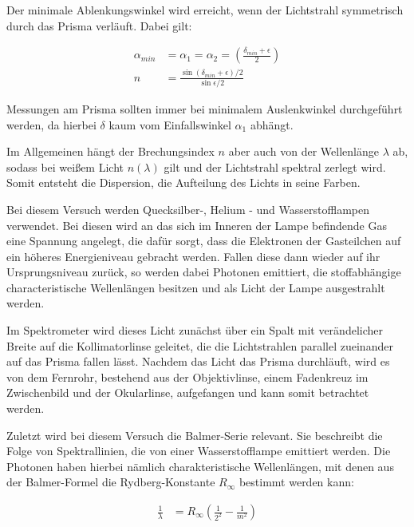 \documentclass{article}
\begin{document}
\newpage

Der minimale Ablenkungswinkel wird erreicht, wenn der Lichtstrahl symmetrisch durch das Prisma verläuft. Dabei gilt:

\begin{equation}
    \begin{split}
        \alpha_{min} &= \alpha_1 = \alpha_2 = \left( \frac{\delta_{min} + \epsilon}{2} \right) \\
        n &= \frac{\sin{(\delta_{min} + \epsilon)/2}}{\sin{\epsilon / 2}}
    \end{split}
\end{equation}

Messungen am Prisma sollten immer bei minimalem Auslenkwinkel durchgeführt werden, da hierbei $\delta$ kaum vom Einfallswinkel $\alpha_1$ abhängt.

Im Allgemeinen hängt der Brechungsindex $n$ aber auch von der Wellenlänge $\lambda$ ab, sodass bei weißem Licht $n(\lambda)$ gilt und der Lichtstrahl spektral zerlegt wird. Somit entsteht die Dispersion, die Aufteilung des Lichts in seine Farben.

Bei diesem Versuch werden Quecksilber-, Helium - und Wasserstofflampen verwendet. Bei diesen wird an das sich im Inneren der Lampe befindende Gas eine Spannung angelegt, die dafür sorgt, dass die Elektronen der Gasteilchen auf ein höheres Energieniveau gebracht werden. Fallen diese dann wieder auf ihr Ursprungsniveau zurück, so werden dabei Photonen emittiert, die stoffabhängige characteristische Wellenlängen besitzen und als Licht der Lampe ausgestrahlt werden. 

Im Spektrometer wird dieses Licht zunächst über ein Spalt mit verändelicher Breite auf die Kollimatorlinse geleitet, die die Lichtstrahlen parallel zueinander auf das Prisma fallen lässt. Nachdem das Licht das Prisma durchläuft, wird es von dem Fernrohr, bestehend aus der Objektivlinse, einem Fadenkreuz im Zwischenbild und der Okularlinse, aufgefangen und kann somit betrachtet werden. 

Zuletzt wird bei diesem Versuch die Balmer-Serie relevant. Sie beschreibt die Folge von Spektrallinien, die von einer Wasserstofflampe emittiert werden. Die Photonen haben hierbei nämlich charakteristische Wellenlängen, mit denen aus der Balmer-Formel die Rydberg-Konstante $R_{\infty}$ bestimmt werden kann:

\begin{equation}
    \begin{split}
        \frac{1}{\lambda} &= R_{\infty} \left( \frac{1}{2^2} - \frac{1}{m^2} \right)
    \end{split}
\end{equation}
\end{document}
